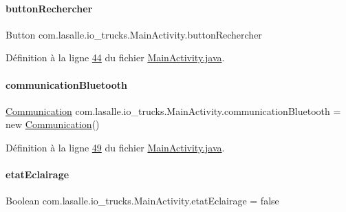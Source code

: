 \paragraph{\texorpdfstring{button\+Rechercher}{buttonRechercher}}
{\footnotesize\ttfamily Button com.\+lasalle.\+io\+\_\+trucks.\+Main\+Activity.\+button\+Rechercher\hspace{0.3cm}{\ttfamily [private]}}



Définition à la ligne \hyperlink{_main_activity_8java_source_l00044}{44} du fichier \hyperlink{_main_activity_8java_source}{Main\+Activity.\+java}.

\mbox{\label{classcom_1_1lasalle_1_1io__trucks_1_1_main_activity_aef1818afc9c0d071330ccc244e4b3794}} 
\paragraph{\texorpdfstring{communication\+Bluetooth}{communicationBluetooth}}
{\footnotesize\ttfamily \hyperlink{classcom_1_1lasalle_1_1io__trucks_1_1_communication}{Communication} com.\+lasalle.\+io\+\_\+trucks.\+Main\+Activity.\+communication\+Bluetooth = new \hyperlink{classcom_1_1lasalle_1_1io__trucks_1_1_communication}{Communication}()\hspace{0.3cm}{\ttfamily [private]}}



Définition à la ligne \hyperlink{_main_activity_8java_source_l00049}{49} du fichier \hyperlink{_main_activity_8java_source}{Main\+Activity.\+java}.

\mbox{\label{classcom_1_1lasalle_1_1io__trucks_1_1_main_activity_a345177f9fe1d73a402a57ce992a5aa1a}} 
\paragraph{\texorpdfstring{etat\+Eclairage}{etatEclairage}}
{\footnotesize\ttfamily Boolean com.\+lasalle.\+io\+\_\+trucks.\+Main\+Activity.\+etat\+Eclairage = false\hspace{0.3cm}{\ttfamily [private]}}



